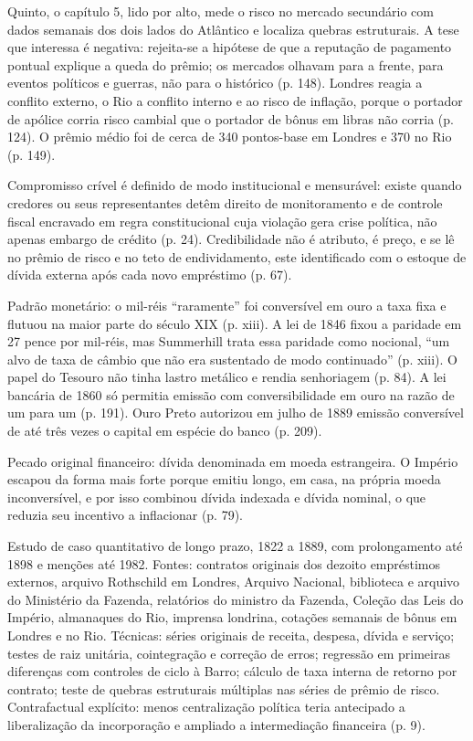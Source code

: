 Quinto, o capítulo 5, lido por alto, mede o risco no mercado secundário com dados semanais dos dois lados do Atlântico e localiza quebras estruturais. A tese que interessa é negativa: rejeita-se a hipótese de que a reputação de pagamento pontual explique a queda do prêmio; os mercados olhavam para a frente, para eventos políticos e guerras, não para o histórico (p. 148). Londres reagia a conflito externo, o Rio a conflito interno e ao risco de inflação, porque o portador de apólice corria risco cambial que o portador de bônus em libras não corria (p. 124). O prêmio médio foi de cerca de 340 pontos-base em Londres e 370 no Rio (p. 149).

Compromisso crível é definido de modo institucional e mensurável: existe quando credores ou seus representantes detêm direito de monitoramento e de controle fiscal encravado em regra constitucional cuja violação gera crise política, não apenas embargo de crédito (p. 24). Credibilidade não é atributo, é preço, e se lê no prêmio de risco e no teto de endividamento, este identificado com o estoque de dívida externa após cada novo empréstimo (p. 67).

Padrão monetário: o mil-réis ``raramente'' foi conversível em ouro a taxa fixa e flutuou na maior parte do século XIX (p. xiii). A lei de 1846 fixou a paridade em 27 pence por mil-réis, mas Summerhill trata essa paridade como nocional, ``um alvo de taxa de câmbio que não era sustentado de modo continuado'' (p. xiii). O papel do Tesouro não tinha lastro metálico e rendia senhoriagem (p. 84). A lei bancária de 1860 só permitia emissão com conversibilidade em ouro na razão de um para um (p. 191). Ouro Preto autorizou em julho de 1889 emissão conversível de até três vezes o capital em espécie do banco (p. 209).

Pecado original financeiro: dívida denominada em moeda estrangeira. O Império escapou da forma mais forte porque emitiu longo, em casa, na própria moeda inconversível, e por isso combinou dívida indexada e dívida nominal, o que reduzia seu incentivo a inflacionar (p. 79).

Estudo de caso quantitativo de longo prazo, 1822 a 1889, com prolongamento até 1898 e menções até 1982. Fontes: contratos originais dos dezoito empréstimos externos, arquivo Rothschild em Londres, Arquivo Nacional, biblioteca e arquivo do Ministério da Fazenda, relatórios do ministro da Fazenda, Coleção das Leis do Império, almanaques do Rio, imprensa londrina, cotações semanais de bônus em Londres e no Rio. Técnicas: séries originais de receita, despesa, dívida e serviço; testes de raiz unitária, cointegração e correção de erros; regressão em primeiras diferenças com controles de ciclo à Barro; cálculo de taxa interna de retorno por contrato; teste de quebras estruturais múltiplas nas séries de prêmio de risco. Contrafactual explícito: menos centralização política teria antecipado a liberalização da incorporação e ampliado a intermediação financeira (p. 9).

